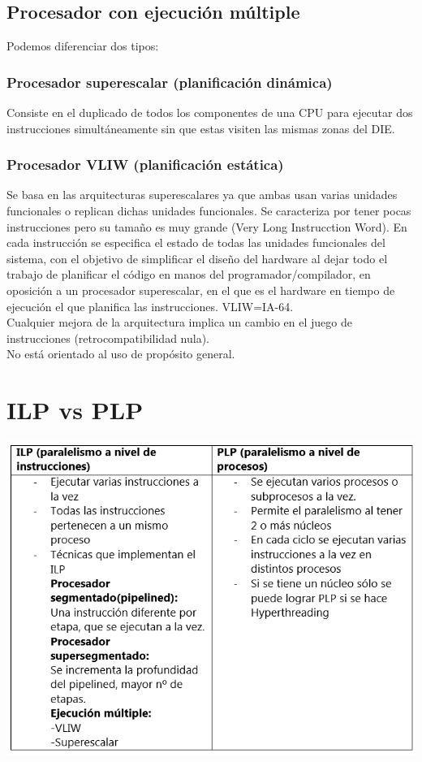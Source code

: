 \documentclass[11pt,letterpaper]{article}
\begin{document}
\subsection{Procesador con ejecución múltiple}
\noindent
Podemos diferenciar dos tipos:
\subsubsection{Procesador superescalar (planificación dinámica)}
\noindent
Consiste en el duplicado de todos los componentes de una CPU para ejecutar dos instrucciones simultáneamente sin que estas visiten las mismas zonas del DIE.
\subsubsection{Procesador VLIW (planificación estática)}
\noindent
Se basa en las arquitecturas superescalares ya que ambas usan varias unidades funcionales o replican dichas unidades funcionales. Se caracteriza por tener pocas instrucciones pero su tamaño es muy grande (Very Long Instrucction Word). En cada instrucción se especifica el estado de todas las unidades funcionales del sistema, con el objetivo de simplificar el diseño del hardware al dejar todo el trabajo de planificar el código en manos del programador/compilador, en oposición a un procesador superescalar, en el que es el hardware en tiempo de ejecución el que planifica las instrucciones. VLIW=IA-64.\\
Cualquier mejora de la arquitectura implica un cambio en el juego de instrucciones (retrocompatibilidad nula).\\
No está orientado al uso de propósito general.

\section{ILP vs PLP}
\begin{center}
	\includegraphics[scale=0.8]{ILPvsPLP.png}
\end{center}
\end{document}
